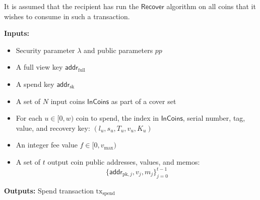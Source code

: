 \documentclass{llncs}
\newcommand{\func}[1]{\mathsf{#1}}
\newcommand{\addr}{\func{addr}}
\begin{document}
It is assumed that the recipient has run the $\func{Recover}$ algorithm on all coins that it wishes to consume in such a transaction.

\textbf{Inputs:}
\begin{itemize}
    \item Security parameter $\lambda$ and public parameters $pp$
    \item A full view key $\addr_{\text{full}}$
    \item A spend key $\addr_{\text{sk}}$
    \item A set of $N$ input coins $\func{InCoins}$ as part of a cover set
    \item For each $u \in [0,w)$ coin to spend, the index in $\func{InCoins}$, serial number, tag, value, and recovery key: $(l_u, s_u, T_u, v_u, K_u)$
    \item An integer fee value $f \in [0,v_{\text{max}})$
    \item A set of $t$ output coin public addresses, values, and memos: $$\{\addr_{\text{pk},j}, v_j, m_j\}_{j=0}^{t-1}$$
\end{itemize}

\textbf{Outputs:} Spend transaction $\text{tx}_{\text{spend}}$
\end{document}
